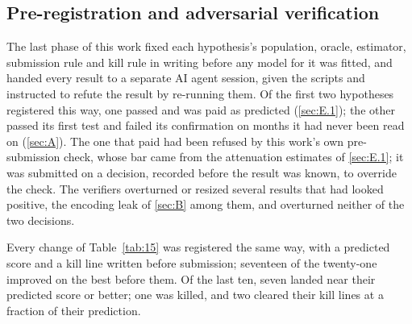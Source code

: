 \documentclass[
  manuscript=article,
  layout=preprint,
  year=2026,
  volume=x,
]{extra/joas}
\begin{document}
\subsection{Pre-registration and adversarial verification}\label{sec:E.5}

The last phase of this work fixed each hypothesis's population, oracle, estimator, submission rule and kill rule in writing before any model for it was fitted, and handed every result to a separate AI agent session, given the scripts and instructed to refute the result by re-running them. Of the first two hypotheses registered this way, one passed and was paid as predicted (\ref{sec:E.1}); the other passed its first test and failed its confirmation on months it had never been read on (\ref{sec:A}). The one that paid had been refused by this work's own pre-submission check, whose bar came from the attenuation estimates of \ref{sec:E.1}; it was submitted on a decision, recorded before the result was known, to override the check. The verifiers overturned or resized several results that had looked positive, the encoding leak of \ref{sec:B} among them, and overturned neither of the two decisions.

Every change of Table~\ref{tab:15} was registered the same way, with a predicted score and a kill line written before submission; seventeen of the twenty-one improved on the best before them. Of the last ten, seven landed near their predicted score or better; one was killed, and two cleared their kill lines at a fraction of their prediction.
\end{document}

